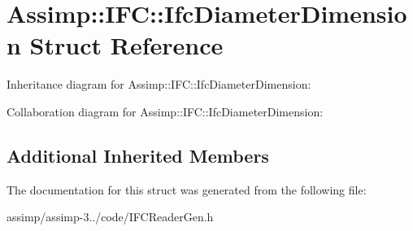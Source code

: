 \hypertarget{struct_assimp_1_1_i_f_c_1_1_ifc_diameter_dimension}{\section{Assimp\+:\+:I\+F\+C\+:\+:Ifc\+Diameter\+Dimension Struct Reference}
\label{struct_assimp_1_1_i_f_c_1_1_ifc_diameter_dimension}
}


Inheritance diagram for Assimp\+:\+:I\+F\+C\+:\+:Ifc\+Diameter\+Dimension\+:


Collaboration diagram for Assimp\+:\+:I\+F\+C\+:\+:Ifc\+Diameter\+Dimension\+:
\subsection*{Additional Inherited Members}


The documentation for this struct was generated from the following file\+:\begin{DoxyCompactItemize}
\item 
assimp/assimp-\/3../code/I\+F\+C\+Reader\+Gen.\+h\end{DoxyCompactItemize}
